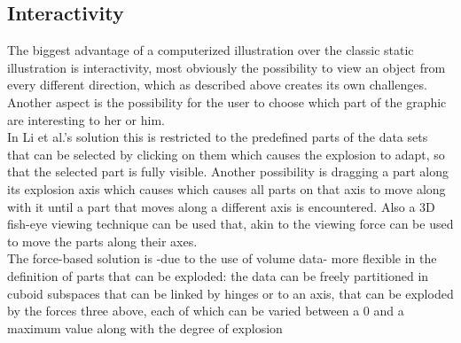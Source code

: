\subsection{Interactivity}
The biggest advantage of a computerized illustration over the classic static illustration is interactivity, most obviously the possibility to view an object from every different direction, which as described above creates its own challenges. Another aspect is the possibility for the user to choose which part of the graphic are interesting to her or him.\\
 In Li et al.'s solution\cite{proc:Li:2008:AGI} this is restricted to the predefined parts of the data sets that can be selected by clicking on them which causes the explosion to adapt, so that the selected part is fully visible. Another possibility is dragging a part along its explosion axis which causes which causes all parts on that axis to move along with it until a part that moves along a different axis is encountered. Also a 3D fish-eye viewing technique can be used that, akin to the viewing force \cite{proc:bruckner-2006-EVV} can be used to move the parts along their axes.\\
The force-based solution is -due to the use of volume data- more flexible in the definition of parts that can be exploded: the data can be freely partitioned in cuboid subspaces that can be linked by hinges or to an axis, that can be exploded by the forces three above, each of which can be varied between a 0 and a maximum value along  with the degree of explosion\\



